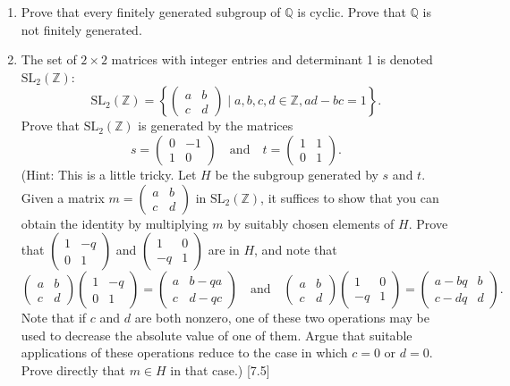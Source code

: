\begin{enumerate}
    \item Prove that every finitely generated subgroup of $\mathbb{Q}$ is cyclic. Prove that $\mathbb{Q}$ is not finitely generated.

    \item The set of $2 \times 2$ matrices with integer entries and determinant 1 is denoted $\text{SL}_2(\mathbb{Z})$:
          \[ \text{SL}_2(\mathbb{Z}) = \left\{ \begin{pmatrix} a & b \\ c & d \end{pmatrix} \mid a, b, c, d \in \mathbb{Z}, ad-bc=1 \right\}. \]
          Prove that $\text{SL}_2(\mathbb{Z})$ is generated by the matrices
          \[ s = \begin{pmatrix} 0 & -1 \\ 1 & 0 \end{pmatrix} \quad \text{and} \quad t = \begin{pmatrix} 1 & 1 \\ 0 & 1 \end{pmatrix}. \]
          (Hint: This is a little tricky. Let $H$ be the subgroup generated by $s$ and $t$. Given a matrix $m = \begin{pmatrix} a & b \\ c & d \end{pmatrix}$ in $\text{SL}_2(\mathbb{Z})$, it suffices to show that you can obtain the identity by multiplying $m$ by suitably chosen elements of $H$. Prove that $\begin{pmatrix} 1 & -q \\ 0 & 1 \end{pmatrix}$ and $\begin{pmatrix} 1 & 0 \\ -q & 1 \end{pmatrix}$ are in $H$, and note that
          \[ \begin{pmatrix} a & b \\ c & d \end{pmatrix} \begin{pmatrix} 1 & -q \\ 0 & 1 \end{pmatrix} = \begin{pmatrix} a & b-qa \\ c & d-qc \end{pmatrix} \quad \text{and} \quad \begin{pmatrix} a & b \\ c & d \end{pmatrix} \begin{pmatrix} 1 & 0 \\ -q & 1 \end{pmatrix} = \begin{pmatrix} a-bq & b \\ c-dq & d \end{pmatrix}. \]
          Note that if $c$ and $d$ are both nonzero, one of these two operations may be used to decrease the absolute value of one of them. Argue that suitable applications of these operations reduce to the case in which $c=0$ or $d=0$. Prove directly that $m \in H$ in that case.) [7.5]


\end{enumerate}
